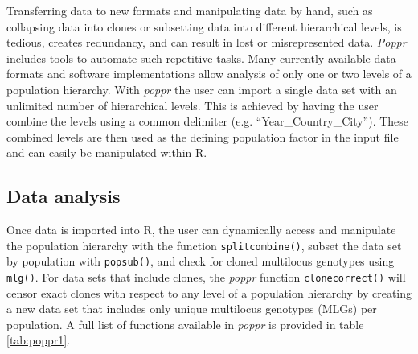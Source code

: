 \documentclass[double,12pt]{beavtex}
\begin{document}
  Transferring data to new formats and manipulating data by hand, such as
  collapsing data into clones or subsetting data into different
  hierarchical levels, is tedious, creates redundancy, and can result in
  lost or misrepresented data. \emph{Poppr} includes tools to automate
  such repetitive tasks. Many currently available data formats and
  software implementations allow analysis of only one or two levels of a
  population hierarchy. With \emph{poppr} the user can import a single
  data set with an unlimited number of hierarchical levels. This is
  achieved by having the user combine the levels using a common delimiter
  (e.g. ``Year\_Country\_City''). These combined levels are then used as
  the defining population factor in the input file and can easily be
  manipulated within R.
  
  \subsection{Data analysis}\label{data-analysis}
  
  Once data is imported into R, the user can dynamically access and
  manipulate the population hierarchy with the function
  \texttt{splitcombine()}, subset the data set by population with
  \texttt{popsub()}, and check for cloned multilocus genotypes using
  \texttt{mlg()}. For data sets that include clones, the \emph{poppr}
  function \texttt{clonecorrect()} will censor exact clones with respect
  to any level of a population hierarchy by creating a new data set that
  includes only unique multilocus genotypes (MLGs) per population. A full
  list of functions available in \emph{poppr} is provided in table
  \ref{tab:poppr1}.
  
\end{document}
